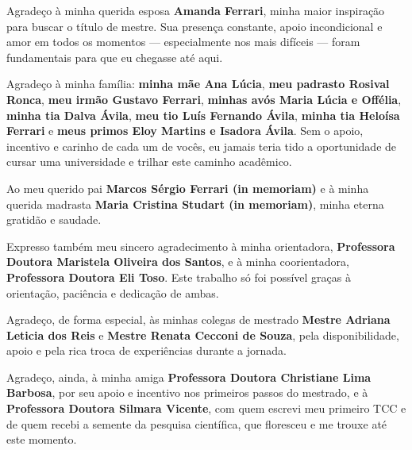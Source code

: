 Agradeço à minha querida esposa \textbf{Amanda Ferrari}, minha maior inspiração para buscar o título de mestre. Sua presença constante, apoio incondicional e amor em todos os momentos — especialmente nos mais difíceis — foram fundamentais para que eu chegasse até aqui.

Agradeço à minha família: \textbf{minha mãe Ana Lúcia}, \textbf{meu padrasto Rosival Ronca}, \textbf{meu irmão Gustavo Ferrari}, \textbf{minhas avós Maria Lúcia e Offélia}, \textbf{minha tia Dalva Ávila}, \textbf{meu tio Luís Fernando Ávila}, \textbf{minha tia Heloísa Ferrari} e \textbf{meus primos Eloy Martins e Isadora Ávila}. Sem o apoio, incentivo e carinho de cada um de vocês, eu jamais teria tido a oportunidade de cursar uma universidade e trilhar este caminho acadêmico.

Ao meu querido pai \textbf{Marcos Sérgio Ferrari (in memoriam)} e à minha querida madrasta \textbf{Maria Cristina Studart (in memoriam)}, minha eterna gratidão e saudade.

Expresso também meu sincero agradecimento à minha orientadora, \textbf{Professora Doutora Maristela Oliveira dos Santos}, e à minha coorientadora, \textbf{Professora Doutora Eli Toso}. Este trabalho só foi possível graças à orientação, paciência e dedicação de ambas.

Agradeço, de forma especial, às minhas colegas de mestrado \textbf{Mestre Adriana Leticia dos Reis} e \textbf{Mestre Renata Cecconi de Souza}, pela disponibilidade, apoio e pela rica troca de experiências durante a jornada.

Agradeço, ainda, à minha amiga \textbf{Professora Doutora Christiane Lima Barbosa}, por seu apoio e incentivo nos primeiros passos do mestrado, e à \textbf{Professora Doutora Silmara Vicente}, com quem escrevi meu primeiro TCC e de quem recebi a semente da pesquisa científica, que floresceu e me trouxe até este momento.